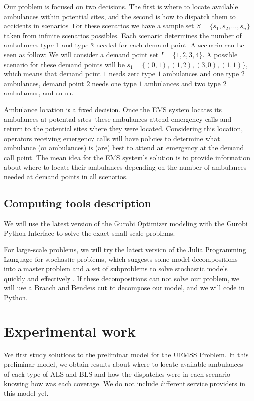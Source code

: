 Our problem is focused on two decisions. The first is where to locate available ambulances within potential sites, and the second is how to dispatch them to accidents in scenarios. For these scenarios we have a sample set $S = \{s_1, s_2, ..., s_n\}$ taken from infinite scenarios possibles. Each scenario determines the number of ambulances type 1 and type 2 needed for each demand point. A scenario can be seen as follow:
We will consider a demand point set $I = \{1, 2, 3, 4\}$. A possible scenario for these demand points will be $s_1 = \{(0, 1), (1, 2), (3, 0), (1, 1)\}$, which means that demand point $1$ needs zero type $1$ ambulances and one type $2$ ambulances, demand point $2$ needs one type $1$ ambulances and two type $2$ ambulances, and so on.

Ambulance location is a fixed decision. Once the EMS system locates its ambulances at potential sites, these ambulances attend emergency calls and return to the potential sites where they were located. Considering this location, operators receiving emergency calls will have policies to determine what ambulance (or ambulances) is (are) best to attend an emergency at the demand call point. The mean idea for the EMS system's solution is to provide information about where to locate their ambulances depending on the number of ambulances needed at demand points in all scenarios.

\section{Computing tools description}
We will use the latest version of the Gurobi Optimizer modeling with the Gurobi Python Interface to solve the exact small-scale problems. 

For large-scale problems, we will try the latest version of the Julia Programming Language for stochastic problems, which suggests some model decompositions into a master problem and a set of subproblems to solve stochastic models quickly and effectively \cite{biel2022efficient}. If these decompositions can not solve our problem, we will use a Branch and Benders cut to decompose our model, and we will code in Python.


\chapter{Experimental work}\label{cap:exper}
We first study solutions to the preliminar model for the UEMSS Problem. In this preliminar model, we obtain results about where to locate available ambulances of each type of ALS and BLS and how the dispatches were in each scenario, knowing how was each coverage. We do not include different service providers in this model yet. 

